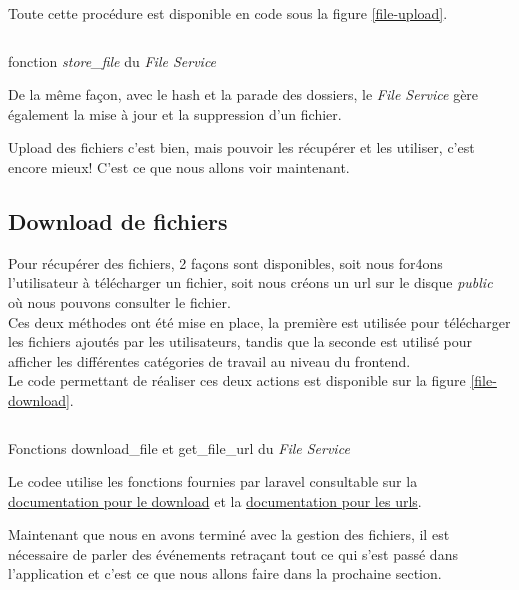 \documentclass[
    iai, %
    il, %
]{heig-tb}
\begin{document}
Toute cette procédure est disponible en code sous la figure \ref{file-upload}.

\begin{listing}[H]
    \inputminted{php}{assets/code/FileUpload.php}
    \caption{fonction \emph{store\_file} du \emph{File Service} \label{file-upload}}
\end{listing}

De la même façon, avec le \Gls{hash} et la parade des dossiers, le \emph{File Service} gère également la mise à jour et la suppression d'un fichier.

Upload des fichiers c'est bien, mais pouvoir les récupérer et les utiliser, c'est encore mieux!
C'est ce que nous allons voir maintenant.

\subsection{Download de fichiers}
Pour récupérer des fichiers, 2 façons sont disponibles, soit nous for4ons l'utilisateur à télécharger un fichier, soit nous créons un \Gls{url} sur le disque \emph{public} où nous pouvons consulter le fichier. \\
Ces deux méthodes ont été mise en place, la première est utilisée pour télécharger les fichiers ajoutés par les utilisateurs, tandis que la seconde est utilisé pour afficher les différentes catégories de travail au niveau du \Gls{frontend}. \\
Le code permettant de réaliser ces deux actions est disponible sur la figure \ref{file-download}.

\begin{listing}[H]
    \inputminted{php}{assets/code/FileDownload.php}
    \caption{Fonctions download\_file et get\_file\_url du \emph{File Service} \label{file-download}}
\end{listing}

Le codee utilise les fonctions fournies par \Gls{laravel} consultable sur la \href{https://laravel.com/docs/9.x/filesystem#downloading-files}{documentation pour le download} et la \href{https://laravel.com/docs/9.x/filesystem#file-urls}{documentation pour les urls}.

Maintenant que nous en avons terminé avec la gestion des fichiers, il est nécessaire de parler des événements retraçant tout ce qui s'est passé dans l'application et c'est ce que nous allons faire dans la prochaine section.
\end{document}
